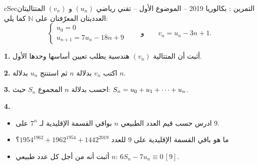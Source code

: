 \documentclass[12pt,a4paper]{article}
\newenvironment{BOX}[2]{\begin{otherlanguage}{english}\begin{arbox}{#1}{#2}}{\end{arbox}\end{otherlanguage}}
\newcounter{exo}
\newenvironment{tamrin}[1]{\stepcounter{exo}\begin{BOX}{cSec}{التمرين \theexo: #1}}{\end{BOX}}
\renewcommand{\cdots}{\mathinner{\cdotp\cdotp\cdotp}}
\newcommand{\N}{\mathbb{N}}
\newenvironment{sq}{\begin{itemize}[leftmargin=2.4em,itemsep=3pt]}{\end{itemize}}
\newcommand{\qa}{\item[(أ)]}\newcommand{\qb}{\item[(ب)]}\newcommand{\qc}{\item[(جـ)]}\newcommand{\qd}{\item[(د)]}\newcommand{\qe}{\item[(هـ)]}
\newcommand{\QQ}[1]{\par\smallskip\textbf{#1.} }
\begin{document}
\begin{tamrin}{بكالوريا 2019 -- الموضوع الأول -- تقني رياضي}
$(u_n)$ و $(v_n)$ المتتاليتان العدديتان المعرّفتان على $\N$ كما يلي:
\[\begin{cases}u_0=0\\ u_{n+1}=7u_n-18n+9\end{cases}\qquad\text{و}\qquad v_n=u_n-3n+1.\]

\QQ{1} أثبت أن المتتالية $(v_n)$ هندسية يطلب تعيين أساسها وحدها الأول.

\QQ{2} اكتب $v_n$ بدلالة $n$ ثم استنتج $u_n$ بدلالة $n$.

\QQ{3} احسب بدلالة $n$ المجموع $S_n$ حيث: $S_n=u_0+u_1+\cdots+u_n$.

\QQ{4}
\begin{sq}
\qa ادرس حسب قيم العدد الطبيعي $n$ بواقي القسمة الإقليدية لـ $7^n$ على $9$.
\qb ما هو باقي القسمة الإقليدية على $9$ للعدد $1954^{1962}+1962^{1954}+1442^{2019}$؟
\qc أثبت أنه من أجل كل عدد طبيعي $n$: $6S_n-7u_n\equiv0\,[9]$.
\end{sq}
\end{tamrin}
\end{document}
